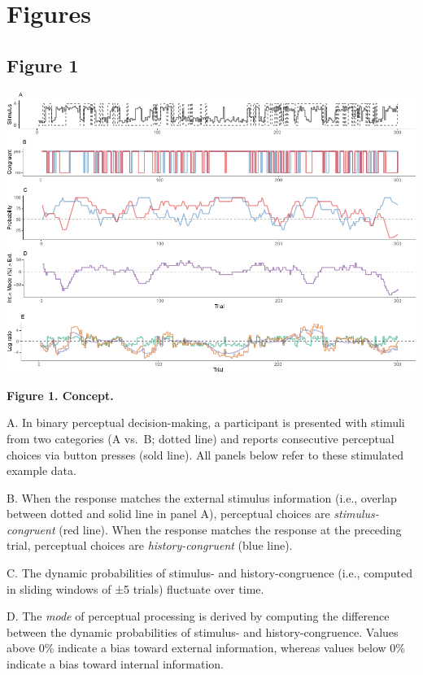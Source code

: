 \documentclass[
]{article}
\begin{document}
\newpage

\hypertarget{figures}{%
\section{Figures}\label{figures}}

\hypertarget{figure-1}{%
\subsection{Figure 1}\label{figure-1}}

\includegraphics{modes_mouse_rev2_files/figure-latex/Figure_1-1.pdf}

\textbf{Figure 1. Concept.}

A. In binary perceptual decision-making, a participant is presented with
stimuli from two categories (A vs.~B; dotted line) and reports
consecutive perceptual choices via button presses (sold line). All
panels below refer to these stimulated example data.

B. When the response matches the external stimulus information (i.e.,
overlap between dotted and solid line in panel A), perceptual choices
are \emph{stimulus-congruent} (red line). When the response matches the
response at the preceding trial, perceptual choices are
\emph{history-congruent} (blue line).

C. The dynamic probabilities of stimulus- and history-congruence (i.e.,
computed in sliding windows of ±5 trials) fluctuate over time.

D. The \emph{mode} of perceptual processing is derived by computing the
difference between the dynamic probabilities of stimulus- and
history-congruence. Values above 0\% indicate a bias toward external
information, whereas values below 0\% indicate a bias toward internal
information.
\end{document}
